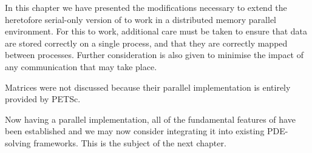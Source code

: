 \documentclass[thesis]{subfiles}
\begin{document}
In this chapter we have presented the modifications necessary to extend the heretofore serial-only version of  to work in a distributed memory parallel environment.
For this to work, additional care must be taken to ensure that data are stored correctly on a single process, and that they are correctly mapped between processes.
Further consideration is also given to minimise the impact of any communication that may take place.

Matrices were not discussed because their parallel implementation is entirely provided by PETSc.

Now having a parallel implementation, all of the fundamental features of  have been established and we may now consider integrating it into existing PDE-solving frameworks.
This is the subject of the next chapter.
\end{document}
